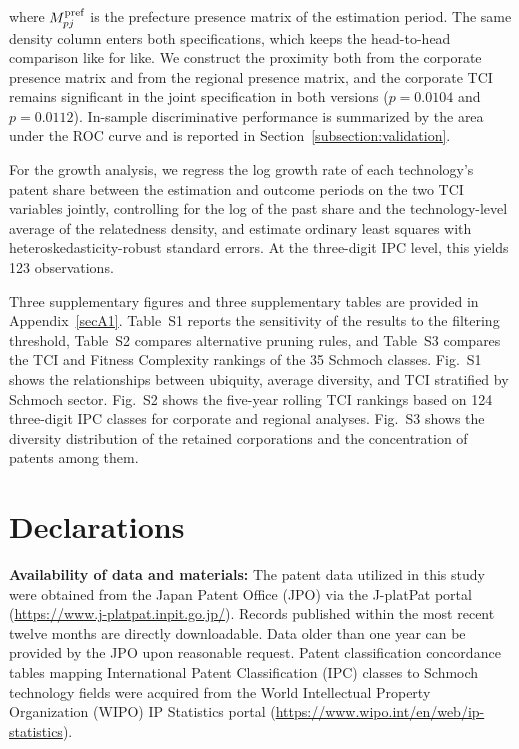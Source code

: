 \documentclass[lineno,pdflatex,sn-mathphys-num]{sn-jnl}%
\theoremstyle{thmstyleone}%
\theoremstyle{thmstyletwo}%
\theoremstyle{thmstylethree}%
\begin{document}
where $M^{\mbox{\scriptsize pref}}_{pj}$ is the prefecture presence matrix of the estimation period.
The same density column enters both specifications, which keeps the head-to-head comparison like for like.
We construct the proximity both from the corporate presence matrix and from the regional presence matrix, and the corporate TCI remains significant in the joint specification in both versions ($p = 0.0104$ and $p = 0.0112$).
In-sample discriminative performance is summarized by the area under the ROC curve and is reported in Section~\ref{subsection:validation}.

For the growth analysis, we regress the log growth rate of each technology's patent share between the estimation and outcome periods on the two TCI variables jointly, controlling for the log of the past share and the technology-level average of the relatedness density, and estimate ordinary least squares with heteroskedasticity-robust standard errors.
At the three-digit IPC level, this yields 123 observations.

\backmatter


Three supplementary figures and three supplementary tables are provided in Appendix~\ref{secA1}.
Table~S1 reports the sensitivity of the results to the filtering threshold, Table~S2 compares alternative pruning rules, and Table~S3 compares the TCI and Fitness Complexity rankings of the 35 Schmoch classes.
Fig.~S1 shows the relationships between ubiquity, average diversity, and TCI stratified by Schmoch sector.
Fig.~S2 shows the five-year rolling TCI rankings based on 124 three-digit IPC classes for corporate and regional analyses.
Fig.~S3 shows the diversity distribution of the retained corporations and the concentration of patents among them.

\section*{Declarations}

\textbf{Availability of data and materials:} The patent data utilized in this study were obtained from the Japan Patent Office (JPO) via the J-platPat portal (\url{https://www.j-platpat.inpit.go.jp/}). Records published within the most recent twelve months are directly downloadable. Data older than one year can be provided by the JPO upon reasonable request. Patent classification concordance tables mapping International Patent Classification (IPC) classes to Schmoch technology fields were acquired from the World Intellectual Property Organization (WIPO) IP Statistics portal (\url{https://www.wipo.int/en/web/ip-statistics}).
\end{document}
